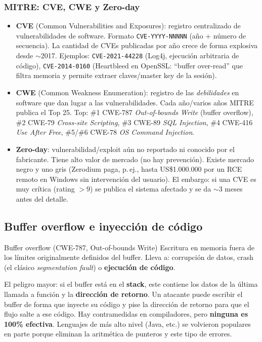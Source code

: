 \documentclass[../main.tex]{subfiles}
\begin{document}
\subsubsection{MITRE: CVE, CWE y Zero-day}
\begin{itemize}
  \item \textbf{CVE} (Common Vulnerabilities and Exposures): registro centralizado de vulnerabilidades de software. Formato \texttt{CVE-YYYY-NNNNN} (año + número de secuencia). La cantidad de CVEs publicadas por año crece de forma explosiva desde $\sim$2017. Ejemplos: \texttt{CVE-2021-44228} (Log4j, ejecución arbitraria de código), \texttt{CVE-2014-0160} (Heartbleed en OpenSSL: ``buffer over-read'' que filtra memoria y permite extraer claves/master key de la sesión).
  \item \textbf{CWE} (Common Weakness Enumeration): registro de las \emph{debilidades} en software que dan lugar a las vulnerabilidades. Cada año/varios años MITRE publica el Top 25. Top: \#1 CWE-787 \emph{Out-of-bounds Write} (buffer overflow), \#2 CWE-79 \emph{Cross-site Scripting}, \#3 CWE-89 \emph{SQL Injection}, \#4 CWE-416 \emph{Use After Free}, \#5/\#6 CWE-78 \emph{OS Command Injection}.
  \item \textbf{Zero-day}: vulnerabilidad/exploit aún no reportado ni conocido por el fabricante. Tiene alto valor de mercado (no hay prevención). Existe mercado negro y uno gris (Zerodium paga, p.\,ej., hasta US\$1.000.000 por un RCE remoto en Windows sin intervención del usuario). El embargo: si una CVE es muy crítica (rating $>9$) se publica el sistema afectado y se da $\sim$3 meses antes del detalle.
\end{itemize}

\subsection{Buffer overflow e inyección de código}

\begin{definicion}{Buffer overflow (CWE-787, Out-of-bounds Write)}
Escritura en memoria fuera de los límites originalmente definidos del buffer. Lleva a: corrupción de datos, crash (el clásico \emph{segmentation fault}) o \textbf{ejecución de código}.
\end{definicion}

El peligro mayor: si el buffer está en el \textbf{stack}, este contiene los datos de la última llamada a función y la \textbf{dirección de retorno}. Un atacante puede escribir el buffer de forma que inyecte su código y pise la dirección de retorno para que el flujo salte a ese código. Hay contramedidas en compiladores, pero \textbf{ninguna es 100\% efectiva}. Lenguajes de más alto nivel (Java, etc.) se volvieron populares en parte porque eliminan la aritmética de punteros y este tipo de errores.
\end{document}
